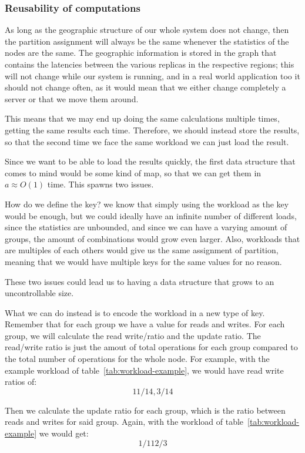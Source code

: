 \subsubsection{Reusability of computations}\label{sec:Reusability-of-computations}
As long as the geographic structure of our whole system does not change, then the partition assignment will always be the same whenever the statistics of the nodes are the same. The geographic information is stored in the graph that contains the latencies between the various replicas in the respective regions; this will not change while our system is running, and in a real world application too it should not change often, as it would mean that we either change completely a server or that we move them around. 

This means that we may end up doing the same calculations multiple times, getting the same results each time. Therefore, we should instead store the results, so that the second time we face the same workload we can just load the result. 

Since we want to be able to load the results quickly, the first data structure that comes to mind would be some kind of map, so that we can get them in $a\approx O(1)$ time. This spawns two issues.

How do we define the key? we know that simply using the workload as the key would be enough, but we could ideally have an infinite number of different loads, since the statistics are unbounded, and since we can have a varying amount of groups, the amount of combinations would grow even larger. Also, workloads that are multiples of each others would give us the same assignment of partition, meaning that we would have multiple keys for the same values for no reason.

These two issues could lead us to having a data structure that grows to an uncontrollable size.

What we can do instead is to encode the workload in a new type of key. Remember that for each group we have a value for reads and writes. For each group, we will calculate the read write/ratio and the update ratio. The read/write ratio is just the amout of total operations for each group compared to the total number of operations for the whole node. For example, with the example workload of table~\ref{tab:workload-example}, we would have read write ratios of:
$$ 11/14, 3/14 $$

Then we calculate the update ratio for each group, which is the ratio between reads and writes for said group. Again, with the workload of table~\ref{tab:workload-example} we would get:
$$1/11 2/3 $$

